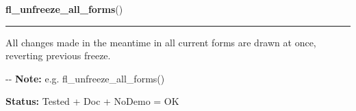     \vspace{0.5ex}

\hspace{.8\funcindent}\begin{boxedminipage}{\funcwidth}

    \raggedright \textbf{fl\_unfreeze\_all\_forms}()

    \vspace{-1.5ex}

    \rule{\textwidth}{0.5\fboxrule}
\setlength{\parskip}{2ex}

All changes made in the meantime in all current forms are drawn at
once, reverting previous freeze.

-{}-
\setlength{\parskip}{1ex}
\textbf{Note:} 
e.g. fl\_unfreeze\_all\_forms()


\textbf{Status:} 
Tested + Doc + NoDemo = OK


    \end{boxedminipage}

    \label{xformslib:flbasic:fl_scale_form}

    \vspace{0.5ex}

